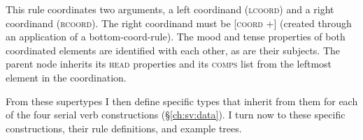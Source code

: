 \ex \label{ex:svc-top-coord-rule}
\xe

This rule coordinates two arguments, a left coordinand (\textsc{lcoord}) and a right coordinand (\textsc{rcoord}). The right coordinand must be [\textsc{coord} +] (created through an application of a bottom-coord-rule). The mood and tense properties of both coordinated elements are identified with each other, as are their subjects. The parent node inherits its \textsc{head} properties and its \textsc{comps} list from the leftmost element in the coordination.

From these supertypes I then define specific types that inherit from them for each of the four serial verb constructions (\S\ref{ch:sv:data}). I turn now to these specific constructions, their rule definitions, and example trees.

